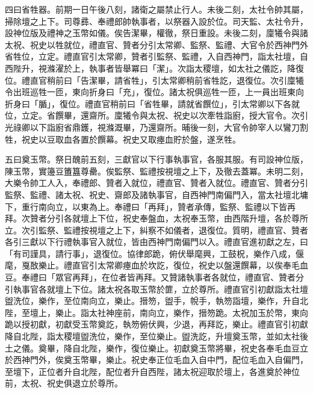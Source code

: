 \begin{pinyinscope}
 四曰省牲器。前期一日午後八刻，諸衛之屬禁止行人。未後二刻，太社令帥其屬，掃除壇之上下。司尊彞、奉禮郎帥執事者，以祭器入設於位。司天監、太社令升，設神位版及禮神之玉幣如儀。俟告潔畢，權徹，祭日重設。未後二刻，廩犧令與諸太祝、祝史以牲就位，禮直官、贊者分引太常卿、監祭、監禮、大官令於西神門外省牲位，立定。禮直官引太常卿，贊者引監祭、監禮，入自西神門，詣太社壇，自西陛升，視滌濯於上，執事者皆舉冪曰「潔」。次詣太稷壇，如太社之儀訖，降復位。禮直官稍前曰「告潔畢，請省牲」，引太常卿稍前省牲訖，退復位。次引廩犧令出班巡牲一匝，東向折身曰「充」，復位。諸太祝俱巡牲一匝，上一員出班東向折身曰「腯」，復位。禮直官稍前曰「省牲畢，請就省饌位」，引太常卿以下各就位，立定。省饌畢，還齋所。廩犧令與太祝、祝史以次牽牲詣廚，授大官令。次引光祿卿以下詣廚省鼎鑊，視滌溉畢，乃還齋所。晡後一刻，大官令帥宰人以鸞刀割牲，祝史以豆取血各置於饌幕。祝史又取瘞血貯於盤，遂烹牲。



 五曰奠玉幣。祭日醜前五刻，三獻官以下行事執事官，各服其服。有司設神位版，陳玉幣，實籩豆簠簋尊罍。俟監祭、監禮按視壇之上下，及徹去蓋冪。未明二刻，大樂令帥工人入，奉禮郎、贊者入就位，禮直官、贊者入就位。禮直官、贊者分引監祭、監禮、諸太祝、祝史、齋郎及諸執事官，自西神門南偏門入，當太社壇北墉下，重行南向立，以東為上。奉禮曰「再拜」，贊者承傳，監祭、監禮以下皆再拜。次贊者分引各就壇上下位，祝史奉盤血，太祝奉玉幣，由西階升壇，各於尊所立。次引監祭、監禮按視壇之上下，糾察不如儀者，退復位。質明，禮直官、贊者各引三獻以下行禮執事官入就位，皆由西神門南偏門以入。禮直官進初獻之左，曰「有司謹具，請行事」，退復位。協律郎跪，俯伏舉麾興，工鼓柷，樂作八成，偃麾，戛敔樂止。禮直官引太常卿瘞血於坎訖，復位，祝史以盤還饌幕，以俟奉毛血豆。奉禮曰「眾官再拜」，在位者皆再拜。又贊諸執事者各就位，禮直官、贊者分引執事官各就壇上下位。諸太祝各取玉幣於篚，立於尊所。禮直官引初獻詣太社壇盥洗位，樂作，至位南向立，樂止。搢笏，盥手，帨手，執笏詣壇，樂作，升自北陛，至壇上，樂止。詣太社神座前，南向立，樂作，搢笏跪。太祝加玉於幣，東向跪以授初獻，初獻受玉幣奠訖，執笏俯伏興，少退，再拜訖，樂止。禮直官引初獻降自北陛，詣太稷壇盥洗位，樂作，至位樂止。盥洗訖，升壇奠玉幣，並如太社後土之儀。奠畢，降自北陛，樂作，復位樂止。初獻奠玉幣將畢，祝史各奉毛血豆立於西神門外，俟奠玉幣畢，樂止。祝史奉正位毛血入自中門，配位毛血入自偏門，至壇下，正位者升自北陛，配位者升自西陛，諸太祝迎取於壇上，各進奠於神位前，太祝、祝史俱退立於尊所。




\end{pinyinscope}
